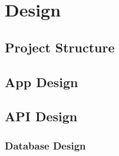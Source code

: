 \chapter{Design}

\section{Project Structure}

\section{App Design}

\section{API Design}

\subsection{Database Design}